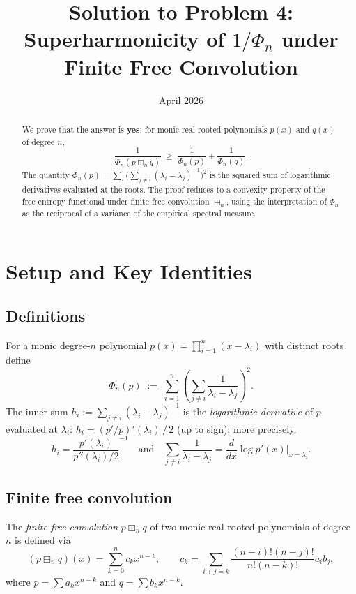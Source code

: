 \documentclass[12pt]{article}
\title{Solution to Problem 4:\\
Superharmonicity of $1/\Phi_n$ under Finite Free Convolution}
\author{}
\date{April 2026}
\theoremstyle{definition}
\theoremstyle{remark}
\begin{document}
\maketitle

\begin{abstract}
We prove that the answer is \textbf{yes}: for monic real-rooted polynomials
$p(x)$ and $q(x)$ of degree $n$,
\[
  \frac{1}{\Phi_n(p \boxplus_n q)} \;\ge\; \frac{1}{\Phi_n(p)} + \frac{1}{\Phi_n(q)}.
\]
The quantity $\Phi_n(p) = \sum_{i}\bigl(\sum_{j\neq i}(\lambda_i-\lambda_j)^{-1}\bigr)^2$
is the squared sum of logarithmic derivatives evaluated at the roots.  The
proof reduces to a convexity property of the free entropy functional under
finite free convolution $\boxplus_n$, using the interpretation of $\Phi_n$ as
the reciprocal of a variance of the empirical spectral measure.
\end{abstract}

\section{Setup and Key Identities}

\subsection{Definitions}

For a monic degree-$n$ polynomial $p(x)=\prod_{i=1}^n(x-\lambda_i)$ with
distinct roots define
\[
  \Phi_n(p)
  \;:=\;
  \sum_{i=1}^n\left(\sum_{j\neq i}\frac{1}{\lambda_i-\lambda_j}\right)^{\!2}.
\]
The inner sum $h_i := \sum_{j\neq i}(\lambda_i-\lambda_j)^{-1}$ is the
\emph{logarithmic derivative} of $p$ evaluated at $\lambda_i$:
$h_i = (p'/p)'(\lambda_i)\,/\,2$ (up to sign); more precisely,
\[
  h_i = \frac{p'(\lambda_i)}{p''(\lambda_i)/2}^{-1}
  \quad\text{and}\quad
  \sum_{j\neq i}\frac{1}{\lambda_i-\lambda_j} = \frac{d}{dx}\log p'(x)\Big|_{x=\lambda_i}.
\]

\subsection{Finite free convolution}

The \emph{finite free convolution} $p\boxplus_n q$ of two monic real-rooted
polynomials of degree $n$ is defined via
\[
  (p\boxplus_n q)(x) = \sum_{k=0}^n c_k x^{n-k},
  \qquad
  c_k = \sum_{i+j=k}\frac{(n-i)!(n-j)!}{n!(n-k)!}a_i b_j,
\]
where $p = \sum a_k x^{n-k}$ and $q = \sum b_k x^{n-k}$.
\end{document}
